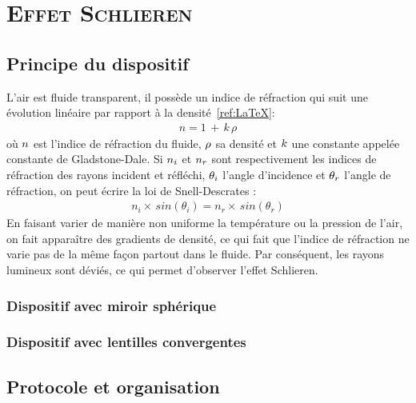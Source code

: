 \renewcommand{\chaptername}{\scshape Partie}
\chapter{\normalfont \scshape Effet Schlieren}
\section{Principe du dispositif}
L'air est fluide transparent, il possède un indice de réfraction qui suit une évolution linéaire par rapport à la densité~\ref{ref:LaTeX}:
\begin{align}
	n = 1\,+\,k\,\rho
\end{align}
où $\mathnormal{n}$ est l'indice de réfraction du fluide, $\mathnormal{\rho}$ sa densité et $\mathnormal{k}$ une constante appelée constante de Gladstone-Dale. Si $\mathnormal{n_i}$ et $\mathnormal{n_r}$ sont respectivement les indices de réfraction des rayons incident et réfléchi, $\mathnormal{\theta_i}$ l'angle d'incidence et $\mathnormal{\theta_r}$ l'angle de réfraction, on peut écrire la loi de Snell-Descrates :
\begin{align}
	n_i\times\,sin(\theta_i) = n_r\times\,sin(\theta_r) 
\end{align}
En faisant varier de manière non uniforme la température ou la pression de l'air, on fait apparaître des gradients de densité, ce qui fait que l'indice de réfraction ne varie pas de la même façon partout dans le fluide. Par conséquent, les rayons lumineux sont déviés, ce qui permet d'observer l'effet Schlieren.
\subsection{Dispositif avec miroir sphérique}
\subsection{Dispositif avec lentilles convergentes}
\section{Protocole et organisation}
